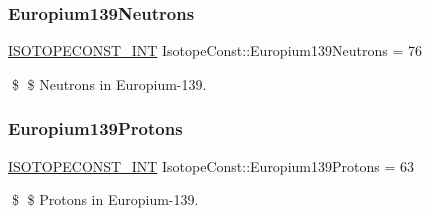 \subsubsection{\texorpdfstring{Europium139\+Neutrons}{Europium139Neutrons}}
{\footnotesize\ttfamily \mbox{\hyperlink{group___isotope_const-_macros_ga5f18360b3e99483a35c32d789e62621c}{I\+S\+O\+T\+O\+P\+E\+C\+O\+N\+S\+T\+\_\+\+I\+NT}} Isotope\+Const\+::\+Europium139\+Neutrons = 76}

\$ \$ Neutrons in Europium-\/139. \mbox{\label{group___isotope_const-_europium-_eu139_ga24133d5cb5e2e299751b5ecebb68d5e4}} 
\subsubsection{\texorpdfstring{Europium139\+Protons}{Europium139Protons}}
{\footnotesize\ttfamily \mbox{\hyperlink{group___isotope_const-_macros_ga5f18360b3e99483a35c32d789e62621c}{I\+S\+O\+T\+O\+P\+E\+C\+O\+N\+S\+T\+\_\+\+I\+NT}} Isotope\+Const\+::\+Europium139\+Protons = 63}

\$ \$ Protons in Europium-\/139. 